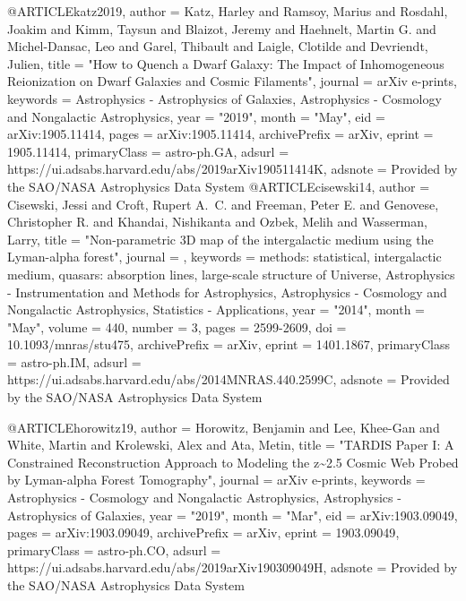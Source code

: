 \documentclass{aa}
\begin{document}
{{{@ARTICLE{katz2019,
       author = {{Katz}, Harley and {Ramsoy}, Marius and {Rosdahl}, Joakim and
         {Kimm}, Taysun and {Blaizot}, Jeremy and {Haehnelt}, Martin G. and
         {Michel-Dansac}, Leo and {Garel}, Thibault and {Laigle}, Clotilde and
         {Devriendt}, Julien},
        title = "{How to Quench a Dwarf Galaxy: The Impact of Inhomogeneous Reionization on Dwarf Galaxies and Cosmic Filaments}",
      journal = {arXiv e-prints},
     keywords = {Astrophysics - Astrophysics of Galaxies, Astrophysics - Cosmology and Nongalactic Astrophysics},
         year = "2019",
        month = "May",
          eid = {arXiv:1905.11414},
        pages = {arXiv:1905.11414},
archivePrefix = {arXiv},
       eprint = {1905.11414},
 primaryClass = {astro-ph.GA},
       adsurl = {https://ui.adsabs.harvard.edu/abs/2019arXiv190511414K},
      adsnote = {Provided by the SAO/NASA Astrophysics Data System}
}
@ARTICLE{cisewski14,
       author = {{Cisewski}, Jessi and {Croft}, Rupert A.~C. and {Freeman}, Peter E. and
         {Genovese}, Christopher R. and {Khandai}, Nishikanta and
         {Ozbek}, Melih and {Wasserman}, Larry},
        title = "{Non-parametric 3D map of the intergalactic medium using the Lyman-alpha forest}",
      journal = {\mnras},
     keywords = {methods: statistical, intergalactic medium, quasars: absorption lines, large-scale structure of Universe, Astrophysics - Instrumentation and Methods for Astrophysics, Astrophysics - Cosmology and Nongalactic Astrophysics, Statistics - Applications},
         year = "2014",
        month = "May",
       volume = {440},
       number = {3},
        pages = {2599-2609},
          doi = {10.1093/mnras/stu475},
archivePrefix = {arXiv},
       eprint = {1401.1867},
 primaryClass = {astro-ph.IM},
       adsurl = {https://ui.adsabs.harvard.edu/abs/2014MNRAS.440.2599C},
      adsnote = {Provided by the SAO/NASA Astrophysics Data System}
}

@ARTICLE{horowitz19,
       author = {{Horowitz}, Benjamin and {Lee}, Khee-Gan and {White}, Martin and
         {Krolewski}, Alex and {Ata}, Metin},
        title = "{TARDIS Paper I: A Constrained Reconstruction Approach to Modeling the z\textasciitilde2.5 Cosmic Web Probed by Lyman-alpha Forest Tomography}",
      journal = {arXiv e-prints},
     keywords = {Astrophysics - Cosmology and Nongalactic Astrophysics, Astrophysics - Astrophysics of Galaxies},
         year = "2019",
        month = "Mar",
          eid = {arXiv:1903.09049},
        pages = {arXiv:1903.09049},
archivePrefix = {arXiv},
       eprint = {1903.09049},
 primaryClass = {astro-ph.CO},
       adsurl = {https://ui.adsabs.harvard.edu/abs/2019arXiv190309049H},
      adsnote = {Provided by the SAO/NASA Astrophysics Data System}
}

}}}
\end{document}
